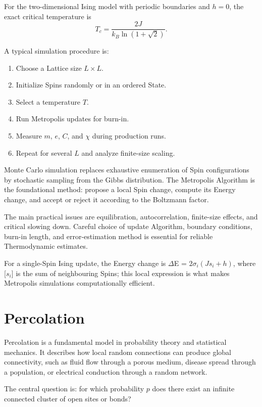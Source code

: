 \documentclass[a4paper, 10pt, onepage]{elegantbook}
\begin{document}
{For the two-dimensional Ising model with periodic boundaries and \(h=0\), the
exact critical temperature is
\[
T_c
=
\frac{2J}{k_B\ln(1+\sqrt2)}.
\]

A typical simulation procedure is:

\begin{enumerate}
\item Choose a Lattice size \(L\times L\).
\item Initialize Spins randomly or in an ordered State.
\item Select a temperature \(T\).
\item Run Metropolis updates for burn-in.
\item Measure \(m\), \(e\), \(C\), and \(\chi\) during production runs.
\item Repeat for several \(L\) and analyze finite-size scaling.
\end{enumerate}

Monte Carlo simulation replaces exhaustive enumeration of Spin configurations
by stochastic sampling from the Gibbs distribution. The Metropolis Algorithm is
the foundational method: propose a local Spin change, compute its Energy change,
and accept or reject it according to the Boltzmann factor.

The main practical issues are equilibration, autocorrelation, finite-size
effects, and critical slowing down. Careful choice of update Algorithm,
boundary conditions, burn-in length, and error-estimation method is essential
for reliable Thermodynamic estimates.

For a single-Spin Ising update, the Energy change is $\Delta$E = $2 \sigma_i \left(Js_i+ h \right)$, 
where [$s_i$] is the sum of neighbouring Spins; this local expression is what makes Metropolis simulations 
computationally efficient.

\newpage

\section{Percolation}

Percolation is a fundamental model in probability theory and statistical
mechanics. It describes how local random connections can produce global
connectivity, such as fluid flow through a porous medium, disease spread through
a population, or electrical conduction through a random network.

The central question is: for which probability \(p\) does there exist an
infinite connected cluster of open sites or bonds?

}
\end{document}
